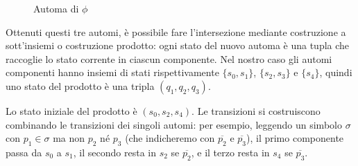 \begin{figure}[H]
  \centering
  \caption{Automa di \(\phi\)}\label{fig:formula_automata}
\end{figure}

Ottenuti questi tre automi, è possibile fare l'intersezione mediante costruzione a sott'insiemi o costruzione prodotto: ogni stato del nuovo automa è una tupla che raccoglie lo stato corrente in ciascun componente. Nel nostro caso gli automi componenti hanno insiemi di stati rispettivamente \(\{s_0,s_1\}\), \(\{s_2,s_3\}\) e \(\{s_4\}\), quindi uno stato del prodotto è una tripla \((q_1,q_2,q_3)\).

Lo stato iniziale del prodotto è \((s_0,s_2,s_4)\). Le transizioni si costruiscono combinando le transizioni dei singoli automi: per esempio, leggendo un simbolo \(\sigma\) con \(p_1\in\sigma\) ma non \(p_2\) né \(p_3\) (che indicheremo con \(\overline{p_2}\) e \(\overline{p_3}\)), il primo componente passa da \(s_0\) a \(s_1\), il secondo resta in \(s_2\) se \(\overline{p_2}\), e il terzo resta in \(s_4\) se \(\overline{p_3}\).

